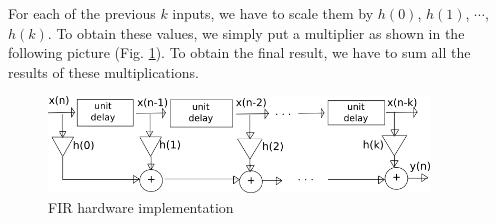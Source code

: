For each of the previous $ k $ inputs, we have to scale them by $ h(0) $, $ h(1) $, $ \cdots $, $ h(k) $. To obtain these values, we simply put a multiplier as shown in the following picture (Fig. \ref{fig:fir2}).
To obtain the final result, we have to sum all the results of these multiplications.
\begin{figure}[h!]
	\centering
	\includegraphics[width=0.9\textwidth]{imm/fir/fir2.png}  
	\caption{FIR hardware implementation} 
	\label{fig:fir2}
\end{figure}
